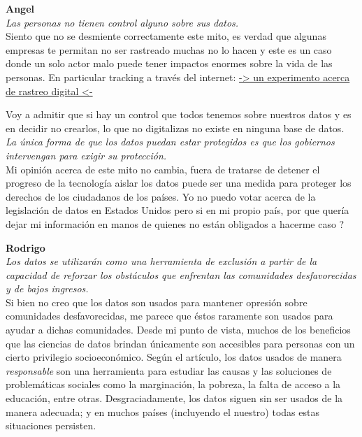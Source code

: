 \documentclass[12pt,a4paper]{article}
\begin{document}
\begin{enumerate}
\begin{enumerate}
				\textbf{Angel}\\
				\textit{Las personas no tienen control alguno sobre sus datos.}\\

				Siento que no se desmiente correctamente este
				mito, es verdad que algunas empresas te permitan
				no ser rastreado muchas no lo hacen y este es
				un caso donde un solo actor malo
				puede tener impactos enormes sobre la vida de
				las personas. En particular tracking
				a través del internet: \href{https://coveryourtracks.eff.org/}{-> un experimento acerca de rastreo digital <-}

				Voy a admitir que si hay un control que todos
				tenemos sobre nuestros datos y es en decidir no
				crearlos, lo que no digitalizas no existe
				en ninguna base de datos.\\

				\textit{La única forma de que los datos puedan estar protegidos es que
				los gobiernos intervengan para exigir su protección.}\\

				Mi opinión acerca de este mito no cambia,
				fuera de tratarse de detener el progreso de la tecnología
				aislar los datos puede ser una medida para proteger los
				derechos de los ciudadanos de los países.
				Yo no puedo votar acerca de la legislación de datos
				en Estados Unidos pero si en mi propio país, por que
				quería dejar mi información en manos de quienes no
				están obligados a hacerme caso ?
				
				\textbf{Rodrigo}\\
				\textit {Los datos se utilizarán como una herramienta de exclusión a 
				partir de la capacidad de reforzar los obstáculos que enfrentan 
				las comunidades desfavorecidas y de bajos ingresos.} \\
				
				Si bien no creo que los datos son usados para mantener opresión sobre 
				comunidades desfavorecidas, me parece que éstos raramente son usados para
				ayudar a dichas comunidades. Desde mi punto de vista, muchos de los beneficios 
				que las ciencias de datos brindan únicamente son accesibles para personas con un 
				cierto privilegio socioeconómico. Según el artículo, los datos usados de manera 
				\textit{responsable} son una herramienta para estudiar las causas y las soluciones 
				de problemáticas sociales como la marginación, la pobreza, la falta de acceso a la educación,
				entre otras. Desgraciadamente, los datos siguen sin ser usados de la manera adecuada; 
				y en muchos países (incluyendo el nuestro) todas estas situaciones persisten. \\
				

\end{enumerate}
\end{enumerate}
\end{document}
